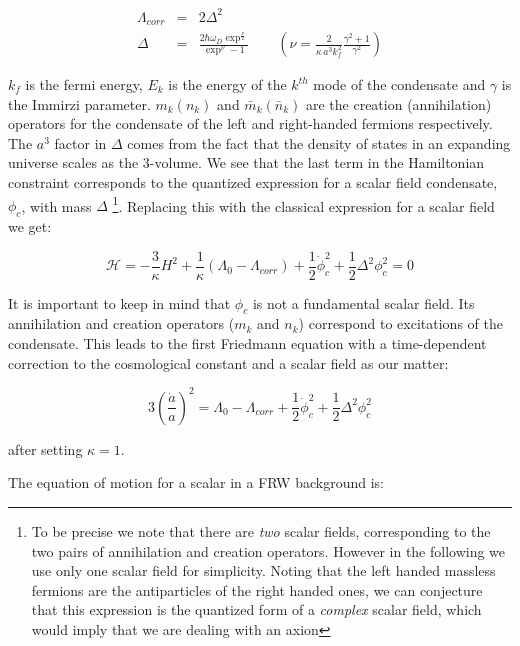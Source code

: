 \begin{doublespace}
\begin{eqnarray}\label{gap1}
    \Lambda_{corr} & = & 2 \Delta^2 \nonumber \\
    \Delta & = & \frac{2\hbar\omega_D \exp^{\frac{\nu}{2}}}{\exp^{\nu} - 1}
    \qquad \left(\nu = \frac{2}{\kappa\, a^3 k_f^2}\frac{\gamma^2 + 1}{\gamma^2} \right)
\end{eqnarray}

$k_f$ is the fermi energy, $E_k$ is the energy of the $k^{th}$ mode
of the condensate and $\gamma$ is the Immirzi parameter. $m_k (n_k)$
and $\bar m_k (\bar n_k)$ are the creation (annihilation) operators
for the condensate of the left and right-handed fermions
respectively. The $a^3$ factor in $\Delta$ comes from the fact that
the density of states in an expanding universe scales as the
3-volume. We see that the last term in the Hamiltonian constraint
corresponds to the quantized expression for a scalar field
condensate, $\phi_{c}$, with mass $\Delta$ \footnote{To be precise
we note that there are \emph{two} scalar fields, corresponding to
the two pairs of annihilation and creation operators. However in the
following we use only one scalar field for simplicity. Noting that
the left handed massless fermions are the antiparticles of the right
handed ones, we can conjecture that this expression is the quantized
form of a \emph{complex} scalar field, which would imply that we are
dealing with an axion}. Replacing this with the classical expression
for a scalar field we get:

\begin{equation}
    \mathcal{H} = -\frac{3}{\kappa}H^2 + \frac{1}{\kappa}(\Lambda_0 - \Lambda_{corr})
        + \frac{1}{2}\dot\phi_c^2 + \frac{1}{2}\Delta^2 \phi_c^2 = 0
\end{equation}

It is important to keep in mind that $\phi_c$ is not a fundamental
scalar field. Its annihilation and creation operators ($m_k$ and
$n_k$) correspond to excitations of the condensate. This leads to
the first Friedmann equation with a time-dependent correction to the
cosmological constant and a scalar field as our matter:

\begin{equation}\label{friedmann_eom}
    3\left(\frac{\dot a}{a}\right)^2 = \Lambda_0 - \Lambda_{corr}
        + \frac{1}{2}\dot\phi_c^2 + \frac{1}{2}\Delta^2 \phi_c^2
\end{equation}

after setting $\kappa = 1$.

The equation of motion for a scalar in a FRW background is:


\end{doublespace}

